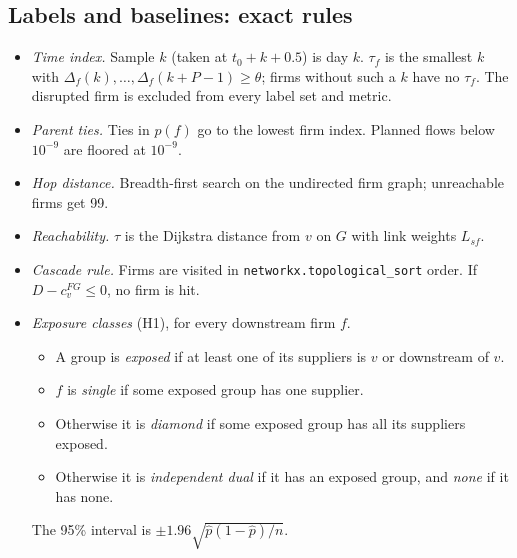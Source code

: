 \documentclass{ifacconf}
\begin{document}
\subsection{Labels and baselines: exact rules}
\begin{itemize}
\item \emph{Time index.} Sample $k$ (taken at $t_0+k+0.5$) is day $k$. $\tau_f$ is the smallest $k$ with $\Delta_f(k),\dots,\Delta_f(k+P-1)\ge\theta$; firms without such a $k$ have no $\tau_f$. The disrupted firm is excluded from every label set and metric.
\item \emph{Parent ties.} Ties in $p(f)$ go to the lowest firm index. Planned flows below $10^{-9}$ are floored at $10^{-9}$.
\item \emph{Hop distance.} Breadth-first search on the undirected firm graph; unreachable firms get 99.
\item \emph{Reachability.} $\tau$ is the Dijkstra distance from $v$ on $G$ with link weights $L_{sf}$.
\item \emph{Cascade rule.} Firms are visited in \texttt{networkx.topological\_sort} order. If $D-c^{FG}_v\le0$, no firm is hit.
\item \emph{Exposure classes} (H1), for every downstream firm $f$.
  \begin{itemize}
  \item A group is \emph{exposed} if at least one of its suppliers is $v$ or downstream of $v$.
  \item $f$ is \emph{single} if some exposed group has one supplier.
  \item Otherwise it is \emph{diamond} if some exposed group has all its suppliers exposed.
  \item Otherwise it is \emph{independent dual} if it has an exposed group, and \emph{none} if it has none.
  \end{itemize}
  The 95\% interval is $\pm1.96\sqrt{\hat p(1-\hat p)/n}$.
\end{itemize}
\end{document}
